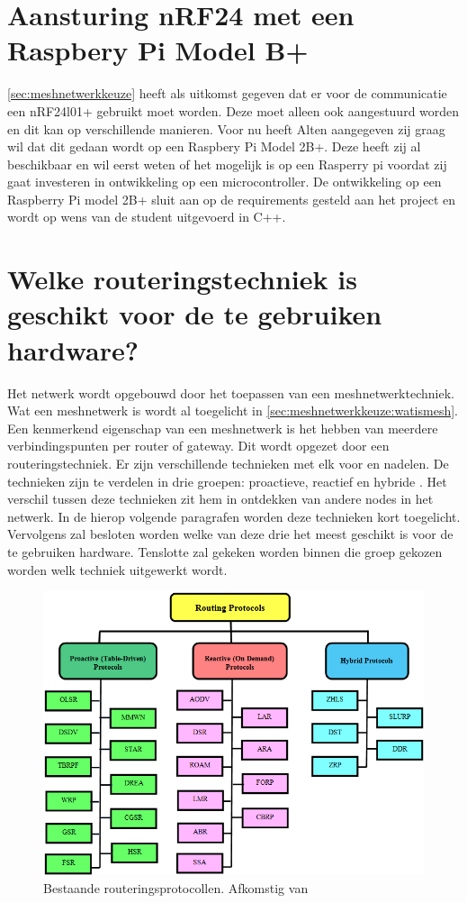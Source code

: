 \documentclass[a4paper, 11pt, oneside]{report}
\begin{document}
\section[nRF24 met Raspbery Pi Model B+]{Aansturing nRF24 met een Raspbery Pi Model B+}

\autoref{sec:meshnetwerkkeuze} heeft als uitkomst gegeven dat er voor de communicatie een nRF24l01+ gebruikt moet worden.
Deze moet alleen ook aangestuurd worden en dit kan op verschillende manieren.
Voor nu heeft Alten aangegeven zij graag wil dat dit gedaan wordt op een Raspbery Pi Model 2B+.
Deze heeft zij al beschikbaar en wil eerst weten of het mogelijk is op een Rasperry pi voordat zij gaat investeren in ontwikkeling op een microcontroller.
De ontwikkeling op een Raspberry Pi model 2B+ sluit aan op de requirements gesteld aan het project en wordt op wens van de student uitgevoerd in C++.


\section[Welke routeringstechniek?]{Welke routeringstechniek is geschikt voor de te gebruiken hardware?}
\label{sec:meshnetwerktechniek}

Het netwerk wordt opgebouwd door het toepassen van een meshnetwerktechniek.
Wat een meshnetwerk is wordt al toegelicht in \autoref{sec:meshnetwerkkeuze:watismesh}.
Een kenmerkend eigenschap van een meshnetwerk is het hebben van meerdere verbindingspunten per router of gateway. Dit wordt opgezet door een routeringstechniek. Er zijn verschillende technieken met elk voor en nadelen. De technieken zijn te verdelen in drie groepen: proactieve, reactief en hybride \cite{meshprotocols}. Het verschil tussen deze technieken zit hem in ontdekken van andere nodes in het netwerk. In de hierop volgende paragrafen worden deze technieken kort toegelicht. Vervolgens zal besloten worden welke van deze drie het meest geschikt is voor de te gebruiken hardware. Tenslotte zal gekeken worden binnen die groep gekozen worden welk techniek uitgewerkt wordt.

\begin{figure}[H]
	\begin{center}\includegraphics[width=0.6\linewidth]{Afbeeldingen/meshprotocollen.png}\end{center}
	\caption{Bestaande routeringsprotocollen. Afkomstig van \protect\cite{meshprotocols}}
	\label{fig:meshprotcollen}
\end{figure}
\end{document}
